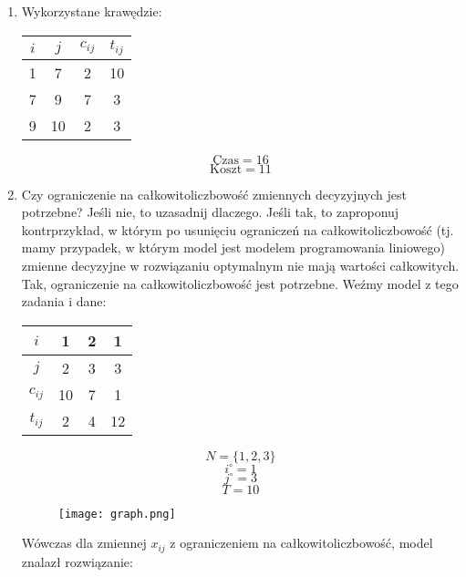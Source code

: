 \documentclass{article}
\begin{document}
\begin{enumerate}[label=(\alph*)]
    \item Wykorzystane krawędzie:
        \begin{table}[H]
            \centering
            \begin{tabular}{|c|c|c|c|}
                \hline
                $i$ & $j$ & $c_{ij}$ & $t_{ij}$ \\
                \hline
                \hline
                1 & 7 & 2 & 10 \\
                \hline
                7 & 9 & 7 & 3 \\
                \hline
                9 & 10 & 2 & 3 \\
                \hline
            \end{tabular}
            \label{tabela_wyniki4.2}
        \end{table}
        \[\text{Czas} = 16\]
        \[\text{Koszt} = 11\]
    \item Czy ograniczenie na całkowitoliczbowość zmiennych decyzyjnych jest potrzebne? Jeśli nie, to uzasadnij dlaczego. Jeśli tak, to zaproponuj kontrprzykład, w którym po usunięciu ograniczeń na całkowitoliczbowość (tj. mamy przypadek, w którym model jest modelem programowania liniowego) zmienne decyzyjne w rozwiązaniu optymalnym nie mają wartości całkowitych.\\[0.2 cm]
    Tak, ograniczenie na całkowitoliczbowość jest potrzebne. Weźmy model z tego zadania i dane:
        \begin{table}[H]
                \centering
                \begin{tabular}{|c||c|c|c|}
                    \hline
                     $i$ & 1 & 2 & 1 \\
                    \hline
                     $j$ & 2 & 3 & 3 \\
                    \hline
                     $c_{ij}$ & 10 & 7 & 1 \\
                    \hline
                     $t_{ij}$ & 2 & 4 & 12 \\
                    \hline
                \end{tabular}
            \end{table}
        \[N = \{1, 2, 3\}\]
        \[i^\circ = 1\]
        \[j^\circ = 3\]
        \[T = 10\]
        \begin{figure}[H]
            \centering
            \texttt{[image: graph.png]}
            \label{fig:graph5}
        \end{figure}
        Wówczas dla zmiennej $x_{ij}$ z ograniczeniem na całkowitoliczbowość, model znalazł rozwiązanie:

\end{enumerate}
\end{document}
